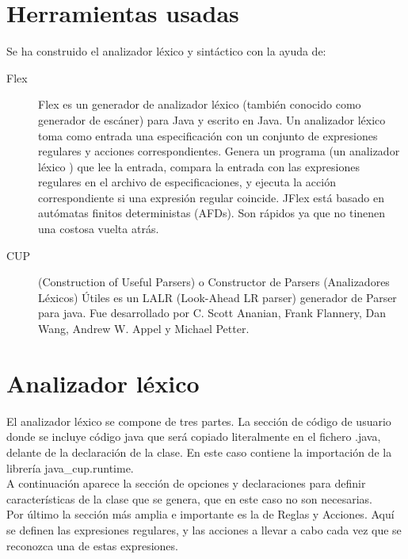 \documentclass{llncs}
\begin{document}
\section{Herramientas usadas}

Se ha construido el analizador léxico y sintáctico con la ayuda de:

\begin{description}
  \item[Flex]
    Flex es un generador de analizador léxico (también conocido como generador de escáner) para Java y escrito en Java.
    Un analizador léxico toma como entrada una especificación con un conjunto de expresiones regulares y acciones
    correspondientes. Genera un programa (un analizador léxico ) que lee la entrada, compara la entrada con las
    expresiones regulares en el archivo de especificaciones, y ejecuta la acción correspondiente si una expresión
    regular coincide. JFlex está basado en autómatas finitos deterministas (AFDs). Son rápidos ya que no tinenen una
    costosa vuelta atrás.\\

  \item[CUP]
    (Construction of Useful Parsers) o Constructor de Parsers (Analizadores Léxicos) Útiles es un LALR (Look-Ahead LR
    parser) generador de Parser para java. Fue desarrollado por C. Scott Ananian, Frank Flannery, Dan Wang, Andrew W.
    Appel y Michael Petter.
\end{description}


\section{Analizador léxico}

El analizador léxico se compone de tres partes. La sección de código de usuario donde se incluye código java que será
copiado literalmente en el fichero .java, delante de la declaración de la clase. En este caso contiene la importación de la librería java\_cup.runtime.\\

A continuación aparece la sección de opciones y declaraciones para definir características de la clase que se genera,
que en este caso no son necesarias.\\

Por último la sección más amplia e importante es la de Reglas y Acciones. Aquí se definen las expresiones regulares, y
las acciones a llevar a cabo cada vez que se reconozca una de estas expresiones.\\
\end{document}
